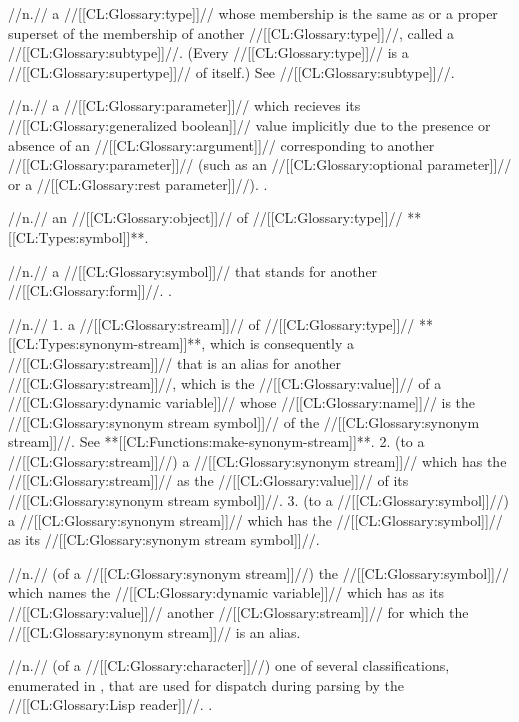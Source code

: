  //n.// a //[[CL:Glossary:type]]// whose membership is the same as or a proper superset of the membership of another //[[CL:Glossary:type]]//, called a //[[CL:Glossary:subtype]]//. (Every //[[CL:Glossary:type]]// is a //[[CL:Glossary:supertype]]// of itself.) See //[[CL:Glossary:subtype]]//.
 
 //n.// a //[[CL:Glossary:parameter]]// which recieves its //[[CL:Glossary:generalized boolean]]// value implicitly due to the presence or absence of an //[[CL:Glossary:argument]]// corresponding to another //[[CL:Glossary:parameter]]// (such as an //[[CL:Glossary:optional parameter]]// or a //[[CL:Glossary:rest parameter]]//). \Seesection\OrdinaryLambdaLists.

 //n.// an //[[CL:Glossary:object]]// of //[[CL:Glossary:type]]// **[[CL:Types:symbol]]**.

 //n.// a //[[CL:Glossary:symbol]]// that stands for another //[[CL:Glossary:form]]//. .


 //n.// 1. a //[[CL:Glossary:stream]]// of //[[CL:Glossary:type]]// **[[CL:Types:synonym-stream]]**, which is consequently a //[[CL:Glossary:stream]]// that is an alias for another //[[CL:Glossary:stream]]//, which is the //[[CL:Glossary:value]]// of a //[[CL:Glossary:dynamic variable]]// whose //[[CL:Glossary:name]]// is the //[[CL:Glossary:synonym stream symbol]]// of the //[[CL:Glossary:synonym stream]]//. See **[[CL:Functions:make-synonym-stream]]**. 2. (to a //[[CL:Glossary:stream]]//) a //[[CL:Glossary:synonym stream]]// which has the //[[CL:Glossary:stream]]// as the //[[CL:Glossary:value]]// of its //[[CL:Glossary:synonym stream symbol]]//. 3. (to a //[[CL:Glossary:symbol]]//) a //[[CL:Glossary:synonym stream]]// which has the //[[CL:Glossary:symbol]]// as its //[[CL:Glossary:synonym stream symbol]]//.

 //n.// (of a //[[CL:Glossary:synonym stream]]//) the //[[CL:Glossary:symbol]]// which names the //[[CL:Glossary:dynamic variable]]// which has as its //[[CL:Glossary:value]]// another //[[CL:Glossary:stream]]// for which the //[[CL:Glossary:synonym stream]]// is an alias.

 //n.// (of a //[[CL:Glossary:character]]//) one of several classifications, enumerated in \figref\PossibleSyntaxTypes, that are used for dispatch during parsing by the //[[CL:Glossary:Lisp reader]]//. \Seesection\CharacterSyntaxTypes.

